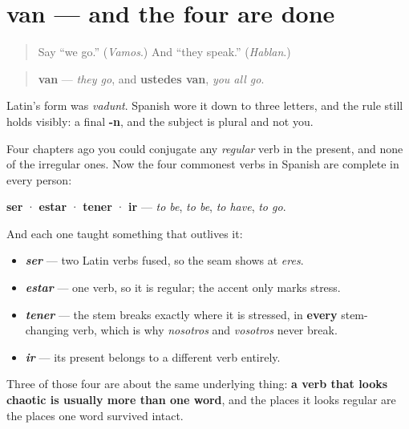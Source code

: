 \section[van]{van — and the four are done}

\label{lesson:ES-C10-van}



\begin{quote}
Say \textquotedblleft{}we go.\textquotedblright{} (\emph{Vamos}.) And \textquotedblleft{}they speak.\textquotedblright{} (\emph{Hablan}.)
\end{quote}

\begin{grammarlens}[title={Grammar Lens: the last form}]
\begin{quote}
\textbf{van} — \emph{they go}, and \textbf{ustedes van}, \emph{you all go}.
\end{quote}

Latin's form was \emph{vadunt}. Spanish wore it down to three letters, and the rule still holds visibly: a final \textbf{-n}, and the subject is plural and not you.
\end{grammarlens}

\begin{grammarlens}[title={What you've built}]
Four chapters ago you could conjugate any \emph{regular} verb in the present, and none of the irregular ones. Now the four commonest verbs in Spanish are complete in every person:

\textbf{ser} · \textbf{estar} · \textbf{tener} · \textbf{ir} — \emph{to be}, \emph{to be}, \emph{to have}, \emph{to go}.

And each one taught something that outlives it:

\begin{itemize}
\raggedright
  \item \emph{\textbf{ser}} — two Latin verbs fused, so the seam shows at \emph{eres}.
  \item \emph{\textbf{estar}} — one verb, so it is regular; the accent only marks stress.
  \item \emph{\textbf{tener}} — the stem breaks exactly where it is stressed, in \textbf{every} stem-changing verb, which is why \emph{nosotros} and \emph{vosotros} never break.
  \item \emph{\textbf{ir}} — its present belongs to a different verb entirely.
\end{itemize}

Three of those four are about the same underlying thing: \textbf{a verb that looks chaotic is usually more than one word}, and the places it looks regular are the places one word survived intact.
\end{grammarlens}

